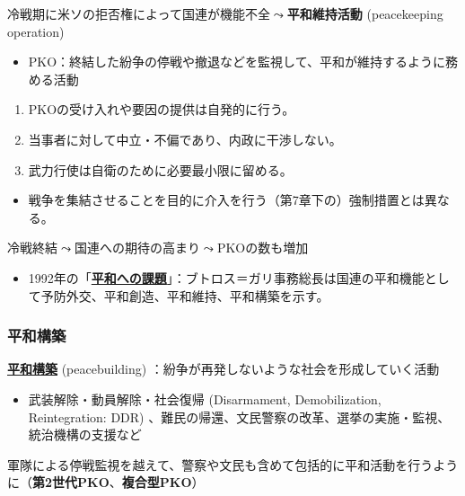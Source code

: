 \documentclass[
  xelatex,
  ja=standard]{bxjsarticle}
\providecommand{\tightlist}{%
  \setlength{\itemsep}{0pt}\setlength{\parskip}{0pt}}\usepackage{longtable,booktabs,array}
\begin{document}
冷戦期に米ソの拒否権によって国連が機能不全\(\leadsto\)\textbf{平和維持活動}
(peacekeeping operation)

\begin{itemize}
\tightlist
\item
  PKO：終結した紛争の停戦や撤退などを監視して、平和が維持するように務める活動
\end{itemize}

\begin{enumerate}
\def\labelenumi{\arabic{enumi}.}
\tightlist
\item
  PKOの受け入れや要因の提供は自発的に行う。
\item
  当事者に対して中立・不偏であり、内政に干渉しない。\\
\item
  武力行使は自衛のために必要最小限に留める。
\end{enumerate}

\begin{itemize}
\tightlist
\item
  戦争を集結させることを目的に介入を行う（第7章下の）強制措置とは異なる。
\end{itemize}

冷戦終結\(\leadsto\)国連への期待の高まり\(\leadsto\)PKOの数も増加

\begin{itemize}
\tightlist
\item
  1992年の「\href{https://www.unic.or.jp/files/peace.pdf}{\textbf{平和への課題}}」：ブトロス＝ガリ事務総長は国連の平和機能として予防外交、平和創造、平和維持、平和構築を示す。
\end{itemize}

\hypertarget{ux5e73ux548cux69cbux7bc9}{%
\subsubsection{平和構築}\label{ux5e73ux548cux69cbux7bc9}}

\href{https://www.mofa.go.jp/mofaj/gaiko/peace_b/index.html}{\textbf{平和構築}}
(peacebuilding) ：紛争が再発しないような社会を形成していく活動

\begin{itemize}
\tightlist
\item
  武装解除・動員解除・社会復帰 (Disarmament, Demobilization,
  Reintegration: DDR)
  、難民の帰還、文民警察の改革、選挙の実施・監視、統治機構の支援など
\end{itemize}

軍隊による停戦監視を越えて、警察や文民も含めて包括的に平和活動を行うように（\textbf{第2世代PKO}、\textbf{複合型PKO}）
\end{document}
